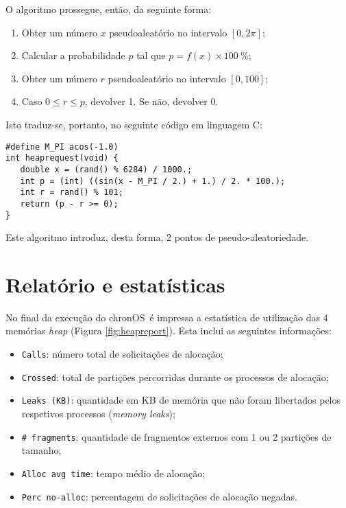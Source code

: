 \documentclass[10pt,oneside]{estiloUBI}
\newcommand{\chronOS}{\textsf{chronOS}}
\begin{document}
	O algoritmo prossegue, então, da seguinte forma:
	
	\begin{enumerate}
		\item Obter um número $x$ pseudoaleatório no intervalo $[0, 2\pi]$;
		\item Calcular a probabilidade $p$ tal que $p = f(x) \times \SI{100}{\percent}$;
		\item Obter um número $r$ pseudoaleatório no intervalo $[0, 100]$;
		\item Caso $0 \leq r \leq p$, devolver 1. Se não, devolver 0.
	\end{enumerate}

	Isto traduz-se, portanto, no seguinte código em linguagem C:

	\begin{verbatim}
#define M_PI acos(-1.0)
int heaprequest(void) {
   double x = (rand() % 6284) / 1000.;
   int p = (int) ((sin(x - M_PI / 2.) + 1.) / 2. * 100.);
   int r = rand() % 101;
   return (p - r >= 0);
}
	\end{verbatim}
	
	Este algoritmo introduz, desta forma, 2 pontos de pseudo-aleatoriedade.
	
	
	\section{Relatório e estatísticas}
	\label{ssec:heap:stat}
	
	No final da execução do \chronOS~é impressa a estatística de utilização das 4 memórias \textit{heap} (Figura \ref{fig:heapreport}). Esta inclui as seguintes informações:
	
	\begin{itemize}
		\item \verb|Calls|: número total de solicitações de alocação;
		\item \verb|Crossed|: total de partições percorridas durante os processos de alocação;
		\item \verb|Leaks (KB)|: quantidade em KB de memória que não foram libertados pelos respetivos processos (\textit{memory leaks});
		\item \verb|# fragments|: quantidade de fragmentos externos com 1 ou 2 partições de tamanho;
		\item \verb|Alloc avg time|: tempo médio de alocação;
		\item \verb|Perc no-alloc|: percentagem de solicitações de alocação negadas.
	\end{itemize}
	
\end{document}
